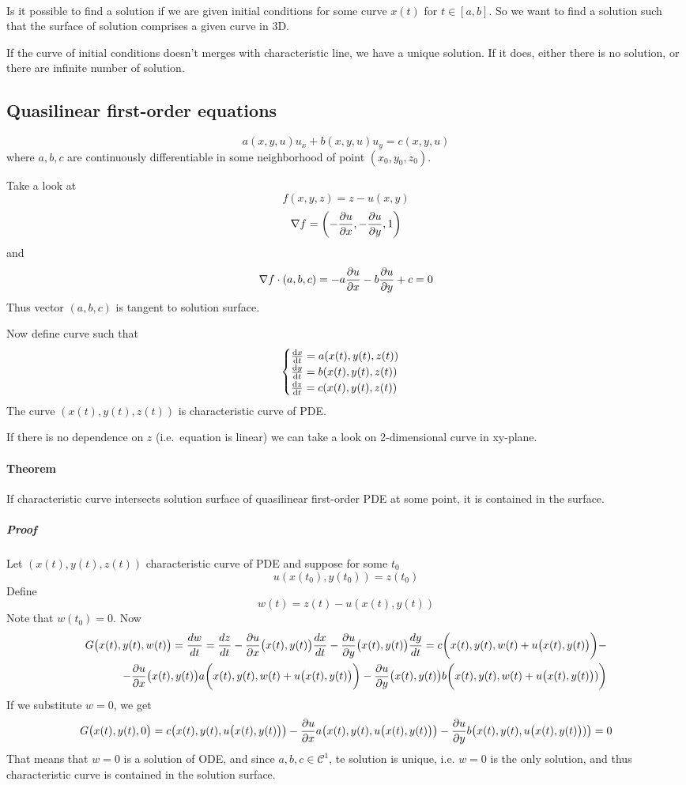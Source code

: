 \paragraph{} Is it possible to find a solution if we are given initial conditions for some curve $x(t)$ for $t \in [a,b]$. So we want to find a solution such that the surface of solution comprises a given curve in 3D.

If the curve of initial conditions doesn't merges with characteristic line, we have a unique solution. If it does, either there is no solution, or there are infinite number of solution.

\subsection{Quasilinear first-order equations}
$$a(x,y,u)u_x + b(x,y,u)u_y = c(x,y,u)$$
where $a,b,c$ are continuously differentiable in some neighborhood of point $(x_0,y_0,z_0)$.

Take a look at
$$f(x,y,z) = z - u(x,y)$$
$$\nabla f = \left(-\pdv{u}{x},-\pdv{u}{y},1\right)$$
and
$$\nabla f \cdot (a,b,c) = -a\pdv{u}{x} -b\pdv{u}{y}+c  = 0$$
Thus vector $(a,b,c) $ is tangent to solution surface.

Now define curve such that
$$\begin{cases}
\dv{x}{t} = a(x(t), y(t), z(t))\\
\dv{y}{t} = b(x(t), y(t), z(t))\\
\dv{z}{t} = c(x(t), y(t), z(t))
\end{cases}$$
The curve $\left(x(t), y(t), z(t)\right)$ is characteristic curve of PDE.

If there is no dependence on $z$ (i.e.\ equation is linear) we can take a look on 2-dimensional curve in xy-plane.

\paragraph{Theorem}
If characteristic curve intersects solution surface of quasilinear first-order PDE at some point, it is contained in the surface.
\subparagraph{Proof}
Let $\left(x(t), y(t), z(t)\right)$ characteristic curve of PDE and suppose for some $t_0$ 
$$u(x(t_0), y(t_0)) = z(t_0)$$
Define 
$$w(t) = z(t) - u(x(t),y(t))$$
Note that $w(t_0) = 0$.  Now
\begin{align*}
G\big(x(t),y(t), w(t)\big) = \frac{dw}{dt} = \frac{dz}{dt} - \pdv{u}{x}\big(x(t), y(t)\big) \frac{dx}{dt}-  \pdv{u}{y}\big(x(t), y(t)\big) \frac{dy}{dt} = c\bigg(x(t),y(t),w(t)+u\big(x(t),y(t)\big)\bigg) -\\- \pdv{u}{x}\big(x(t), y(t)\big) a\bigg(x(t),y(t),w(t)+u\big(x(t),y(t)\big)\bigg) - \pdv{u}{y}\big(x(t), y(t)\big) b\bigg(x(t),y(t),w(t)+u\big(x(t),y(t)\big))\bigg)
\end{align*}
If we substitute $w=0$, we get
$$G\big(x(t),y(t), 0\big) = c\big(x(t),y(t),u\big(x(t),y(t)\big)\big) -\pdv{u}{x}(x(t), y(t)) a\big(x(t),y(t),u\big(x(t),y(t)\big)\big) - \pdv{u}{y}(x(t), y(t)) b\big(x(t),y(t),u\big(x(t),y(t)\big))\big)=0$$
That means that $w=0$ is a solution of ODE, and since $a,b,c\in \mathcal{C}^1$, te solution is unique, i.e. $w=0$ is the only solution, and thus characteristic curve is contained in the solution surface.
